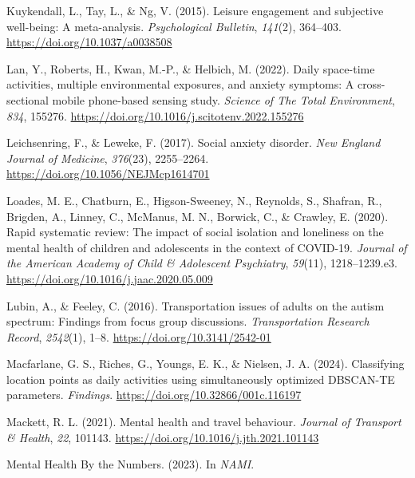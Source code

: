 \documentclass[
  letterpaper,
  number,
  review,
  3p]{elsarticle}
\newlength{\cslhangindent}
\newenvironment{CSLReferences}[2] %
 {\begin{list}{}{%
  \setlength{\itemindent}{0pt}
  \setlength{\leftmargin}{0pt}
  \setlength{\parsep}{0pt}
  \ifodd #1
   \setlength{\leftmargin}{\cslhangindent}
   \setlength{\itemindent}{-1\cslhangindent}
  \fi
  \setlength{\itemsep}{#2\baselineskip}}}
 {\end{list}}
\begin{document}
\begin{CSLReferences}{1}{0}
Kuykendall, L., Tay, L., \& Ng, V. (2015). Leisure engagement and
subjective well-being: {A} meta-analysis. \emph{Psychological Bulletin},
\emph{141}(2), 364--403. \url{https://doi.org/10.1037/a0038508}

Lan, Y., Roberts, H., Kwan, M.-P., \& Helbich, M. (2022). Daily
space-time activities, multiple environmental exposures, and anxiety
symptoms: {A} cross-sectional mobile phone-based sensing study.
\emph{Science of The Total Environment}, \emph{834}, 155276.
\url{https://doi.org/10.1016/j.scitotenv.2022.155276}

Leichsenring, F., \& Leweke, F. (2017). Social anxiety disorder.
\emph{New England Journal of Medicine}, \emph{376}(23), 2255--2264.
\url{https://doi.org/10.1056/NEJMcp1614701}

Loades, M. E., Chatburn, E., Higson-Sweeney, N., Reynolds, S., Shafran,
R., Brigden, A., Linney, C., McManus, M. N., Borwick, C., \& Crawley, E.
(2020). Rapid systematic review: {The} impact of social isolation and
loneliness on the mental health of children and adolescents in the
context of {COVID-19}. \emph{Journal of the American Academy of Child \&
Adolescent Psychiatry}, \emph{59}(11), 1218--1239.e3.
\url{https://doi.org/10.1016/j.jaac.2020.05.009}

Lubin, A., \& Feeley, C. (2016). Transportation issues of adults on the
autism spectrum: {Findings} from focus group discussions.
\emph{Transportation Research Record}, \emph{2542}(1), 1--8.
\url{https://doi.org/10.3141/2542-01}

Macfarlane, G. S., Riches, G., Youngs, E. K., \& Nielsen, J. A. (2024).
Classifying location points as daily activities using simultaneously
optimized {DBSCAN-TE} parameters. \emph{Findings}.
\url{https://doi.org/10.32866/001c.116197}

Mackett, R. L. (2021). Mental health and travel behaviour. \emph{Journal
of Transport \& Health}, \emph{22}, 101143.
\url{https://doi.org/10.1016/j.jth.2021.101143}

Mental {Health By} the {Numbers}. (2023). In \emph{NAMI}.


\end{CSLReferences}
\end{document}
